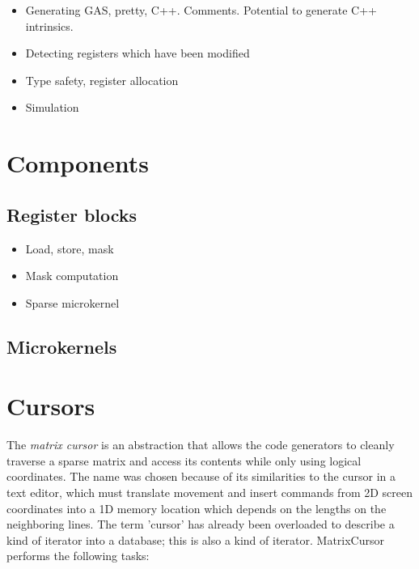 \begin{itemize}
  \item Generating GAS, pretty, C++. Comments. Potential to generate C++ intrinsics.
  \item Detecting registers which have been modified
  \item Type safety, register allocation
  \item Simulation
\end{itemize}


\section{Components}
\subsection{Register blocks}
\begin{itemize}
  \item Load, store, mask
  \item Mask computation
  \item Sparse microkernel
\end{itemize}

\subsection{Microkernels}

\section{Cursors}


    The \emph{matrix cursor} is an abstraction that allows the code generators to cleanly traverse a sparse matrix and access its contents while only using logical coordinates. The name was chosen because of its similarities to the cursor in a text editor, which must translate movement and insert commands from 2D screen coordinates into a 1D memory location which depends on the lengths on the neighboring lines. The term 'cursor' has already been overloaded to describe a kind of iterator into a database; this is also a kind of iterator. MatrixCursor performs the following tasks:

